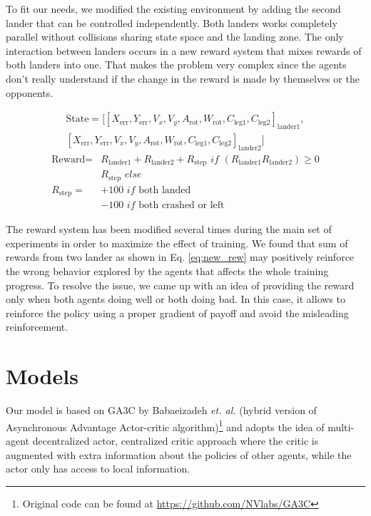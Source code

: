 \documentclass[12pt, letter]{article}
\begin{document}
To fit our needs, we modified the existing environment by adding the second lander that can be controlled independently. Both landers works completely parallel without collisions sharing state space and the landing zone. The only interaction between landers occurs in a new reward system that mixes rewards of both landers into one. That makes the problem very complex since the agents don't really understand if the change in the reward is made by themselves or the opponents.

\begin{align}
\text{State} = [[X_\text{err},Y_\text{err}, V_{x}, V_{y}, A_\text{rot},W_\text{rot},C_\text{leg1},C_\text{leg2}]_\text{lander1},\\
[X_\text{err},Y_\text{err}, V_{x}, V_{y}, A_\text{rot},W_\text{rot},C_\text{leg1},C_\text{leg2}]_\text{lander2}] 
\end{align}
\begin{align}
\text{Reward} = &R_\text{lander1} + R_\text{lander2} + R_\text{step} \textit{ if } (R_\text{lander1} R_\text{lander2}) \ge 0
\label{eq:new_rew}\\
&R_\text{step} \textit{ else} \\
R_\text{step} = &+100\textit{ if } \text{both landed}\\
&-100\textit{ if } \text{both crashed or left}
\end{align}

The reward system has been modified several times during the main set of experiments in order to maximize the effect of training. We found that sum of rewards from two lander as shown in Eq. \ref{eq:new_rew} may positively reinforce the wrong behavior explored by the agents that affects the whole training progress. To resolve the issue, we came up with an idea of providing the reward only when both agents doing well or both doing bad. In this case, it allows to reinforce the policy using a proper gradient of payoff and avoid the misleading reinforcement.

\section{Models}

Our model is based on GA3C by Babaeizadeh {\it et. al.}\cite{babaeizadeh2016} (hybrid version of Asynchronous Advantage Actor-critic algorithm)\footnote{Original code can be found at \href{https://github.com/NVlabs/GA3C}{https://github.com/NVlabs/GA3C}} and adopts the idea of multi-agent decentralized actor, centralized critic approach where the critic is augmented with extra information about the policies of other agents, while the actor only has access
to local information\cite{lowe2017}.
\end{document}
